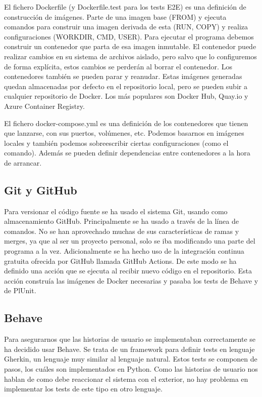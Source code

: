 \documentclass[12pt]{report} %
\begin{document}
El fichero Dockerfile (y Dockerfile.test para los tests E2E) es una definición de construcción de imágenes. Parte de una imagen base (FROM) y ejecuta comandos para construir una imagen derivada de esta (RUN, COPY) y realiza configuraciones (WORKDIR, CMD, USER). Para ejecutar el programa debemos construir un contenedor que parta de esa imagen inmutable. El contenedor puede realizar cambios en su sistema de archivos aislado, pero salvo que lo configuremos de forma explícita, estos cambios se perderán al borrar el contenedor. Los contenedores también se pueden parar y reanudar. Estas imágenes generadas quedan almacenadas por defecto en el repositorio local, pero se pueden subir a cualquier repositorio de Docker. Los más populares son Docker Hub, Quay.io y Azure Container Registry.

El fichero docker-compose.yml es una definición de los contenedores que tienen que lanzarse, con sus puertos, volúmenes, etc. Podemos basarnos en imágenes locales y también podemos sobreescribir ciertas configuraciones (como el comando). Además se pueden definir dependencias entre contenedores a la hora de arrancar.

\subsection{Git y GitHub}
Para versionar el código fuente se ha usado el sistema Git, usando como almacenamiento GitHub. Principalmente se ha usado a través de la línea de comandos.
No se han aprovechado muchas de sus características de ramas y merges, ya que al ser un proyecto personal, solo se iba modificando una parte del programa a la vez.
Adicionalmente se ha hecho uso de la integración continua gratuita ofrecida por GitHub llamada GitHub Actions. De este modo se ha definido una acción que se ejecuta al recibir nuevo código en el repositorio.
Esta acción construía las imágenes de Docker necesarias y pasaba los tests de Behave y de PlUnit.

\subsection{Behave}
Para asegurarnos que las historias de usuario se implementaban correctamente se ha decidido usar Behave.
Se trata de un framework para definir tests en lenguaje Gherkin, un lenguaje muy similar al lenguaje natural. Estos tests se componen de pasos,
los cuáles son implementados en Python. Como las historias de usuario nos hablan de como debe reaccionar el sistema con el exterior, no hay problema en implementar los tests de este tipo en otro lenguaje.
\end{document}
